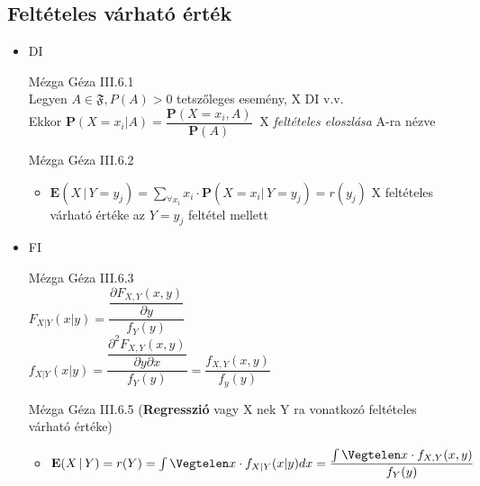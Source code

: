 \subsection{Feltételes várható érték}
	\begin{itemize}

		\item DI

    \begin{definicio}{Mézga Géza}
			III.6.1 \\[2pt]
			 \forceindent	Legyen $A \in \mathfrak{F}, P(A) > 0$ tetszőleges esemény, X DI v.v.\\[2pt]
			 \forceindent Ekkor $\mathbf{P} (X = x_i|A)  = \dfrac{ \mathbf{P}(X = x_i, A) }{\mathbf{P} (A) } \ $ X \textit{feltételes eloszlása} A-ra nézve
\end{definicio}

       \begin{definicio}{Mézga Géza}
			III.6.2
			\begin{itemize}
				\item $\mathbf{E}(X \, |\, Y = y_j) = \sum\limits_{\forall x_i} x_i \cdot \mathbf{P} (X = x_i |\, Y = y_j) = r(y_j) $  X feltételes várható értéke az $Y = y_j$ feltétel mellett
			\end{itemize}
      \end{definicio}

		\item FI \\[-6pt]

    \begin{definicio}{Mézga Géza}
			III.6.3 \\[2pt]
				\forceindent $F_{X|Y}(x|y) = \dfrac{ \dfrac{ \partial F_{X,Y}(x,y)} {\partial y} }{ f_Y(y) }$\\[3pt]

				\forceindent $f_{X|Y}(x|y) = \dfrac{ \dfrac{ \partial^2 F_{X,Y}(x,y)} {\partial y \partial x} }{ f_Y(y) } = \dfrac{f_{X,Y}(x,y) }{ f_y(y) }$\\[2pt]
\end{definicio}
        \begin{definicio}{Mézga Géza}
			III.6.5 (\textbf{Regresszió} vagy X nek Y ra vonatkozó feltételes várható értéke)
			\begin{itemize}
				\item $\mathbf{E}(X \, |\, Y ) = r(Y) = \int\Vegtelen x \cdot f_{X|Y}(x|y) dx = \dfrac{ \int\Vegtelen x \cdot f_{X,Y}(x,y) }{ f_Y(y) }$
			\end{itemize}
      \end{definicio}
	\end{itemize}

